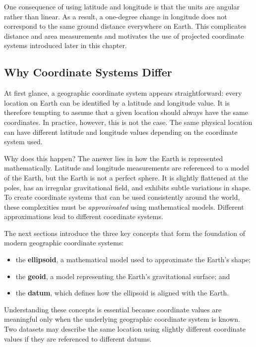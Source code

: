 \documentclass[
  letterpaper,
]{book}
\providecommand{\tightlist}{%
  \setlength{\itemsep}{0pt}\setlength{\parskip}{0pt}}
\begin{document}
One consequence of using latitude and longitude is that the units are
angular rather than linear. As a result, a one-degree change in
longitude does not correspond to the same ground distance everywhere on
Earth. This complicates distance and area measurements and motivates the
use of projected coordinate systems introduced later in this chapter.

\subsection{Why Coordinate Systems
Differ}\label{why-coordinate-systems-differ}

At first glance, a geographic coordinate system appears straightforward:
every location on Earth can be identified by a latitude and longitude
value. It is therefore tempting to assume that a given location should
always have the same coordinates. In practice, however, this is not the
case. The same physical location can have different latitude and
longitude values depending on the coordinate system used.

Why does this happen? The answer lies in how the Earth is represented
mathematically. Latitude and longitude measurements are referenced to a
model of the Earth, but the Earth is not a perfect sphere. It is
slightly flattened at the poles, has an irregular gravitational field,
and exhibits subtle variations in shape. To create coordinate systems
that can be used consistently around the world, these complexities must
be \emph{approximated} using mathematical models. Different
approximations lead to different coordinate systems.

The next sections introduce the three key concepts that form the
foundation of modern geographic coordinate systems:

\begin{itemize}
\tightlist
\item
  the \textbf{ellipsoid}, a mathematical model used to approximate the
  Earth's shape;
\item
  the \textbf{geoid}, a model representing the Earth's gravitational
  surface; and
\item
  the \textbf{datum}, which defines how the ellipsoid is aligned with
  the Earth.
\end{itemize}

Understanding these concepts is essential because coordinate values are
meaningful only when the underlying geographic coordinate system is
known. Two datasets may describe the same location using slightly
different coordinate values if they are referenced to different datums.
\end{document}
